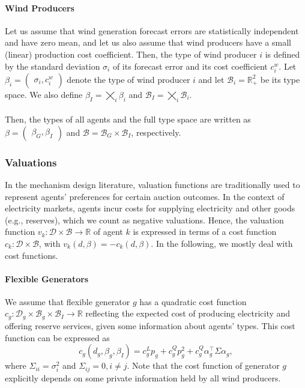 \documentclass{article}
\begin{document}
\paragraph{Wind Producers} Let us assume that wind generation forecast errors are statistically independent and have zero mean, and let us also assume that wind producers have a small (linear) production cost coefficient. Then, the type of wind producer $i$ is defined by the standard deviation $\sigma_i$ of its forecast error and its cost coefficient $c_i^w$. Let $\beta_i = \begin{pmatrix}\sigma_i, c_i^w\end{pmatrix}$ denote the type of wind producer $i$ and let $\mathcal{B}_i = \mathbb{R}_+^2$ be its type space. We also define $\beta_I = \bigtimes_i \beta_i$ and $\mathcal{B}_I = \bigtimes_i \mathcal{B}_i$.

\paragraph{} Then, the types of all agents and the full type space are written as $\beta = \begin{pmatrix}\beta_G, \beta_I\end{pmatrix}$ and $\mathcal{B} = \mathcal{B}_G \times \mathcal{B}_I$, respectively.

\subsubsection{Valuations}

In the mechanism design literature, valuation functions are traditionally used to represent agents' preferences for certain auction outcomes. In the context of electricity markets, agents incur costs for supplying electricity and other goods (e.g., reserves), which we count as negative valuations. Hence, the valuation function $v_k: \mathcal{D} \times \mathcal{B} \rightarrow \mathbb{R}$ of agent $k$ is expressed in terms of a cost function $c_k: \mathcal{D} \times \mathcal{B}$, with $v_k(d, \beta) = -c_k(d, \beta)$. In the following, we mostly deal with cost functions.  

\paragraph{Flexible Generators} We assume that flexible generator $g$ has a quadratic cost function $c_g: \mathcal{D}_g \times \mathcal{B}_g \times \mathcal{B}_I \rightarrow \mathbb{R}$ reflecting the expected cost of producing electricity and offering reserve services, given some information about agents' types. This cost function can be expressed as
\begin{equation*}
c_g(d_g, \beta_g, \beta_I) = c_g^L p_g + c_g^Q p_g^2 + c_g^Q \alpha_g^\top \Sigma \alpha_g,
\end{equation*}
where $\Sigma_{ii} = \sigma_i^2$ and $\Sigma_{ij} = 0, i \ne j$. Note that the cost function of generator $g$ explicitly depends on some private information held by all wind producers.
\end{document}
